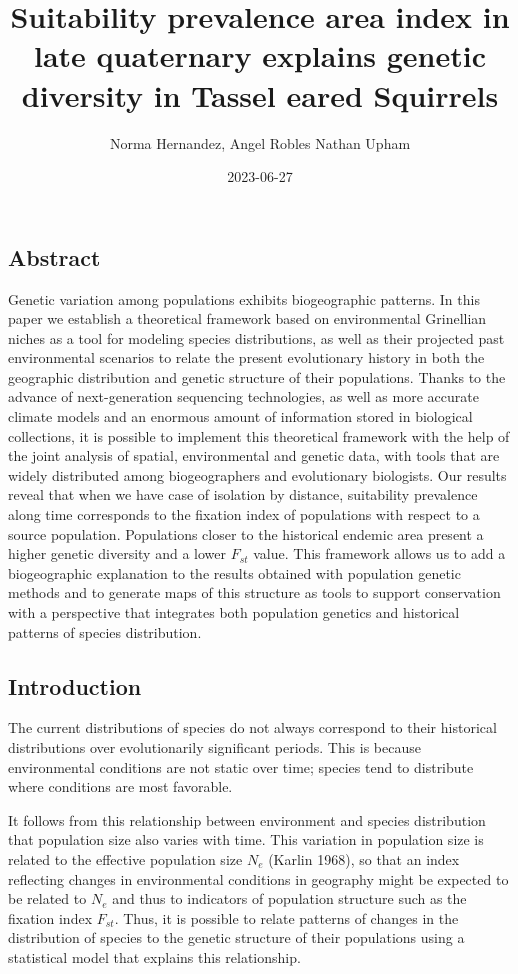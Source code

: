 \documentclass[
]{article}
\title{Suitability prevalence area index in late quaternary explains
genetic diversity in Tassel eared Squirrels}
\author{Norma Hernandez, Angel Robles Nathan Upham}
\date{2023-06-27}
\begin{document}
\maketitle

\hypertarget{abstract}{%
\subsection{Abstract}\label{abstract}}

Genetic variation among populations exhibits biogeographic patterns. In
this paper we establish a theoretical framework based on environmental
Grinellian niches as a tool for modeling species distributions, as well
as their projected past environmental scenarios to relate the present
evolutionary history in both the geographic distribution and genetic
structure of their populations. Thanks to the advance of next-generation
sequencing technologies, as well as more accurate climate models and an
enormous amount of information stored in biological collections, it is
possible to implement this theoretical framework with the help of the
joint analysis of spatial, environmental and genetic data, with tools
that are widely distributed among biogeographers and evolutionary
biologists. Our results reveal that when we have case of isolation by
distance, suitability prevalence along time corresponds to the fixation
index of populations with respect to a source population. Populations
closer to the historical endemic area present a higher genetic diversity
and a lower \(F_{st}\) value. This framework allows us to add a
biogeographic explanation to the results obtained with population
genetic methods and to generate maps of this structure as tools to
support conservation with a perspective that integrates both population
genetics and historical patterns of species distribution.

\hypertarget{introduction}{%
\subsection{Introduction}\label{introduction}}

The current distributions of species do not always correspond to their
historical distributions over evolutionarily significant periods. This
is because environmental conditions are not static over time; species
tend to distribute where conditions are most favorable.

It follows from this relationship between environment and species
distribution that population size also varies with time. This variation
in population size is related to the effective population size \(N_e\)
(Karlin 1968), so that an index reflecting changes in environmental
conditions in geography might be expected to be related to \(N_e\) and
thus to indicators of population structure such as the fixation index
\(F_{st}\). Thus, it is possible to relate patterns of changes in the
distribution of species to the genetic structure of their populations
using a statistical model that explains this relationship.
\end{document}
